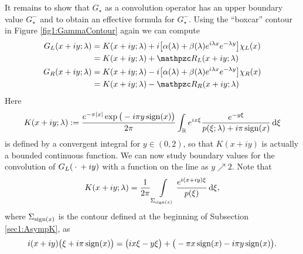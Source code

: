 \documentclass[../dissertation.tex]{subfiles}
\begin{document}
It remains to show that $G_\star$ as a convolution operator has an upper boundary 
value $G_\star^-$ and to obtain an effective formula for $G_\star^-$. Using the 
``boxcar'' contour in Figure \ref{fig1:GammaContour} again we can compute
\begin{subequations}
	\label{eq3:ILW.GFz.rep}
	\begin{align}
		\label{eq3:ILW.GLz.rep}
		G_L(x+ iy; \lambda)
			&= 
				K(x+iy; \lambda) 
				+ i \big[
						\alpha(\lambda) + \beta(\lambda) e^{i\lambda x}e^{-\lambda y} 
					\big] \chi_L(x) \\
			&= 
				K(x+iy; \lambda) + \mathpzc R_L(x+iy; \lambda) 
				\nonumber \\
		G_R(x+ iy; \lambda)
			&= 
				K(x+iy; \lambda) 
				- i \big[
						\alpha(\lambda) + \beta(\lambda) e^{i\lambda x}e^{-\lambda y} 
					\big] \chi_R(x) \\
			&= 
				K(x+iy; \lambda) - \mathpzc R_R(x+iy; \lambda) 
				\nonumber
\end{align}
\end{subequations}
Here
\begin{equation}
	\label{eq3:ILW.K.z}
	K(x + iy; \lambda) 
				:= \frac{e^{-\pi|x|} \exp\big(- i \pi y \operatorname{sign}(x)  \big)}{2\pi} 
					\int_{\mathbb R} e^{i x \xi} 
						\frac{e^{-y\xi}}{p(\xi; \lambda) + i \pi \operatorname{sign}(x)}
					\, \mathrm{d}\xi
\end{equation}
is defined by a convergent integral for $y \in (0,2)$, so that $K(x+iy)$ is actually 
a bounded continuous function. We can now study boundary values for the convolution of 
$G_L(\kern 0.5ex \cdot \kern 0.5ex+iy)$ with a function on the line as $y \nearrow 2$.  Note that
\[
	K(x + iy; \lambda)
		= \frac{1}{2 \pi} \int\limits_{\Sigma_{\operatorname{sign}(x)}} \frac{e^{i(x + iy) \xi}}{p(\xi)} \, \mathrm{d}\xi,
\]
where $\Sigma_{\operatorname{sign}(x)}$ is the contour defined at the beginning of Subsection \ref{sec1:AsympK},
as 
\[
	i(x + iy)\big(\xi + i \pi \operatorname{sign}(x) \big)
		= \big( i x \xi - y \xi\big) 
			+ \big( -\pi x \operatorname{sign}(x) - i \pi y \operatorname{sign}(x) \big).
\]
\end{document}
